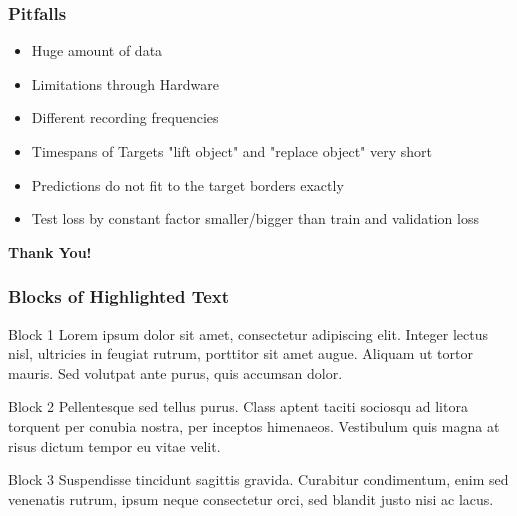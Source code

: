 \documentclass{beamer}
\begin{document}
\begin{frame}
	\frametitle{Pitfalls}
	\begin{itemize}
		\item Huge amount of data
		\item Limitations through Hardware
		\item Different recording frequencies
		\item Timespans of Targets "lift object" and "replace object" very short
        \item Predictions do not fit to the target borders exactly
        \item Test loss by constant factor smaller/bigger than train and validation loss
	\end{itemize}
\end{frame}


\begin{frame}
\begin{center}
	\textbf{\Huge{Thank You!}}
\end{center}
\end{frame}


\begin{frame}
\frametitle{Blocks of Highlighted Text}
\begin{block}{Block 1}
Lorem ipsum dolor sit amet, consectetur adipiscing elit. Integer lectus nisl, ultricies in feugiat rutrum, porttitor sit amet augue. Aliquam ut tortor mauris. Sed volutpat ante purus, quis accumsan dolor.
\end{block}

\begin{block}{Block 2}
Pellentesque sed tellus purus. Class aptent taciti sociosqu ad litora torquent per conubia nostra, per inceptos himenaeos. Vestibulum quis magna at risus dictum tempor eu vitae velit.
\end{block}

\begin{block}{Block 3}
Suspendisse tincidunt sagittis gravida. Curabitur condimentum, enim sed venenatis rutrum, ipsum neque consectetur orci, sed blandit justo nisi ac lacus.
\end{block}
\end{frame}
\end{document}
